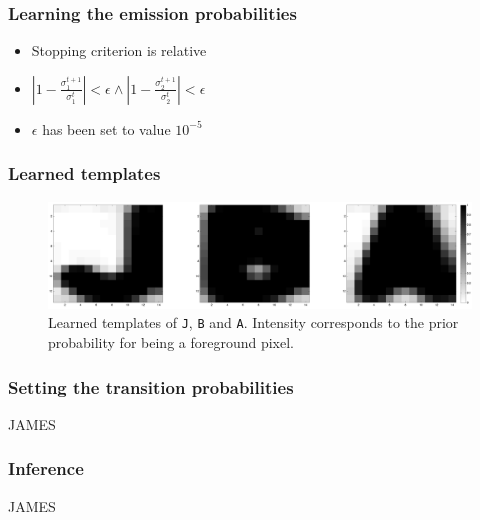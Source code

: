 \documentclass{beamer}
\begin{document}
\begin{frame}
  \frametitle{Learning the emission probabilities}
\begin{itemize}
\item Stopping criterion is relative
\item  $|1-\frac{\sigma_1^{t+1}}{\sigma_1^{t}}| < \epsilon \wedge |1-\frac{\sigma_2^{t+1}}{\sigma_2^{t}}| < \epsilon$
\item$\epsilon$ has been set to value $10^{-5}$
\end{itemize}  
\end{frame}

\begin{frame}
  \frametitle{Learned templates}
\begin{figure}[htp]
\centering
\includegraphics[width=\linewidth]{pics/jba.png}
\caption{Learned templates of \texttt{J}, \texttt{B} and
  \texttt{A}. Intensity corresponds to the prior probability for being
  a foreground pixel.}
\label{fig:templates}
\end{figure}
\end{frame}




\begin{frame}
  \frametitle{Setting the transition probabilities}
  JAMES
\end{frame}


\begin{frame}
  \frametitle{Inference}
  JAMES
\end{frame}
\end{document}
